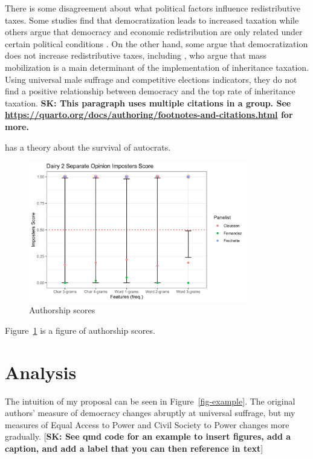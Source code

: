 \documentclass[12pt, ]{article}
\begin{document}
There is some disagreement about what political factors influence
redistributive taxes. Some studies find that democratization leads to
increased taxation while others argue that democracy and economic
redistribution are only related under certain political conditions
\citep{acemoglu2015democracy, albertus2014gaming}. On the other hand,
some argue that democratization does not increase redistributive taxes,
including \citet{scheve2012}, who argue that mass mobilization is a main
determinant of the implementation of inheritance taxation. Using
universal male suffrage and competitive elections indicators, they do
not find a positive relationship between democracy and the top rate of
inheritance taxation. \textbf{SK: This paragraph uses multiple citations
in a group. See
\url{https://quarto.org/docs/authoring/footnotes-and-citations.html} for
more.}

\citet{de2005logic} has a theory about the survival of autocrats.

\begin{figure}[tbp]

{\centering \includegraphics[width=0.85\textwidth,height=\textheight]{figures/imposters.png}

}

\caption{\label{fig-imposters}Authorship scores}

\end{figure}

Figure~\ref{fig-imposters} is a figure of authorship scores.

\hypertarget{analysis}{%
\section{Analysis}\label{analysis}}

The intuition of my proposal can be seen in Figure~\ref{fig-example}.
The original authors' measure of democracy changes abruptly at universal
suffrage, but my measures of Equal Access to Power and Civil Society to
Power changes more gradually. {[}\textbf{SK: See qmd code for an example
to insert figures, add a caption, and add a label that you can then
reference in text}{]}
\end{document}
